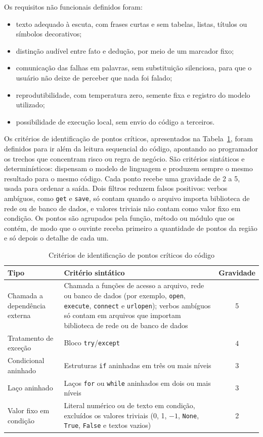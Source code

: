 \documentclass[
    12pt,                   %
    openright,              %
    oneside,                %
    a4paper,                %
    sumario=tradicional,    %
    english,                %
    brazil,                 %
    ]{abntex2}
\begin{document}
Os requisitos não funcionais definidos foram:

\begin{itemize}
  \item texto adequado à escuta, com frases curtas e sem tabelas, listas, títulos ou símbolos decorativos;
  \item distinção audível entre fato e dedução, por meio de um marcador fixo;
  \item comunicação das falhas em palavras, sem substituição silenciosa, para que o usuário não deixe de perceber que nada foi falado;
  \item reprodutibilidade, com temperatura zero, semente fixa e registro do modelo utilizado;
  \item possibilidade de execução local, sem envio do código a terceiros.
\end{itemize}

Os critérios de identificação de pontos críticos, apresentados na Tabela~\ref{tab:regras}, foram definidos para ir além da leitura sequencial do código, apontando ao programador os trechos que concentram risco ou regra de negócio. São critérios sintáticos e determinísticos: dispensam o modelo de linguagem e produzem sempre o mesmo resultado para o mesmo código. Cada ponto recebe uma gravidade de 2 a 5, usada para ordenar a saída. Dois filtros reduzem falsos positivos: verbos ambíguos, como \texttt{get} e \texttt{save}, só contam quando o arquivo importa biblioteca de rede ou de banco de dados, e valores triviais não contam como valor fixo em condição. Os pontos são agrupados pela função, método ou módulo que os contém, de modo que o ouvinte receba primeiro a quantidade de pontos da região e só depois o detalhe de cada um.

\begin{table}[htbp]
  \centering
  \caption{Critérios de identificação de pontos críticos do código}
  \label{tab:regras}
  \begin{tabular}{p{4.0cm}p{8.4cm}c}
    \toprule
    \textbf{Tipo} & \textbf{Critério sintático} & \textbf{Gravidade} \\
    \midrule
    Chamada a dependência externa & Chamada a funções de acesso a arquivo, rede ou banco de dados (por exemplo, \texttt{open}, \texttt{execute}, \texttt{connect} e \texttt{urlopen}); verbos ambíguos só contam em arquivos que importam biblioteca de rede ou de banco de dados & 5 \\
    Tratamento de exceção & Bloco \texttt{try}/\texttt{except} & 4 \\
    Condicional aninhado & Estruturas \texttt{if} aninhadas em três ou mais níveis & 3 \\
    Laço aninhado & Laços \texttt{for} ou \texttt{while} aninhados em dois ou mais níveis & 3 \\
    Valor fixo em condição & Literal numérico ou de texto em condição, excluídos os valores triviais (0, 1, $-1$, \texttt{None}, \texttt{True}, \texttt{False} e textos vazios) & 2 \\
    \bottomrule
  \end{tabular}
\end{table}
\end{document}
